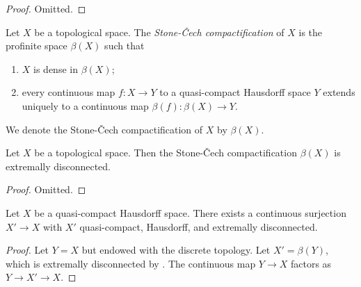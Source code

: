 \begin{proof}
  \mathlibok
  Omitted.
\end{proof}

\begin{definition} 
  \label{def:stone-cech-compactification}
  \mathlibok
  Let \(X\) be a topological space. The \emph{Stone-Čech compactification} of \(X\) is the
  profinite space \(\beta(X)\) such that
  \begin{enumerate}
    \item \(X\) is dense in \(\beta(X)\);
    \item every continuous map \(f: X \to Y\) to a quasi-compact Hausdorff space \(Y\)
        extends uniquely to a continuous map \(\beta(f): \beta(X) \to Y\).
  \end{enumerate}
  We denote the Stone-Čech compactification of \(X\) by \(\beta(X)\).
\end{definition}

\begin{theorem}
    Let \(X\) be a topological space. Then the Stone-Čech compactification \(\beta(X)\) is extremally disconnected.
    \label{thm:stone-cech-extremally-disconnected}
    \mathlibok
\end{theorem}

\begin{proof}
  \mathlibok
  Omitted.
\end{proof}

\begin{proposition}
  Let $X$ be a quasi-compact Hausdorff space. There exists a continuous surjection $X' \to X$ with $X'$ quasi-compact, Hausdorff, and extremally disconnected.
  \label{thm:extremally-disconnected-cover}
  \mathlibok
\end{proposition}

\begin{proof}
  \mathlibok
  Let $Y=X$ but endowed with the discrete topology. Let $X'=\beta (Y)$, which is extremally disconnected by . The continuous map $Y \to X$ factors as $Y \to X' \to X$.
\end{proof}

